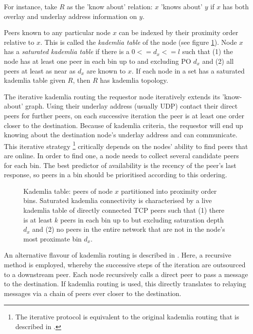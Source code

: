 \documentclass[a4paper,10pt,fullpage]{article}
\numberwithin{equation}{section}
\newcommand\gloss[1]{\emph{\gls{#1}}}
\theoremstyle{definition}
\begin{document}
For instance, take $R$ as the 'know about' relation:
$x$ 'knows about' $y$ if $x$ has both overlay and underlay address information on $y$. 


Peers known to any particular node $x$ can be indexed by their proximity order relative to $x$. This is called the \gloss{kademlia table} of the node (see figure \ref{fig:kademliatable}). 
Node $x$ has a \gloss{saturated kademlia table} if there is a $0<=d_x<=l$ such that (1) the node has at least one peer in each bin up to and excluding PO $d_x$ and (2) all peers at least as near as $d_x$ are known to $x$. 
If each node in a set has a saturated kademlia table given $R$, then $R$ has kademlia topology.


The iterative kademlia routing the requestor node iteratively extends its 'know-about' graph. Using their underlay address (usually UDP) contact their direct peers for further peers, on each successive iteration the peer is at least one order closer to the destination. Because of kademlia criteria, the requestor will end up knowing about the destination node's underlay address and can communicate. This iterative strategy%
%
\footnote{The iterative protocol is equivalent to   the original kademlia routing that is described in \cite{maymounkov2002kademlia}.
}
%
critically depends on the nodes' ability to find peers that are online. In order to find one, a node needs to collect several candidate peers for each bin. The best predictor of availability is the recency of the peer's last response, so peers in a bin should be prioritised according to this ordering.




\begin{figure}[htbp]
   \centering
   \caption{Kademlia table:  peers of node $x$ partitioned into proximity order bins. Saturated kademlia connectivity is 
   characterised by a live kademlia table of directly connected TCP peers such that (1) there is at least $k$ peers in each bin up to but excluding saturation depth $d_x$ and (2) no peers in the entire network that are not in the node's most proximate bin $d_x$. }
   \label{fig:kademliatable}
\end{figure}

An alternative flavour of kademlia routing is described in \cite{heep2010r}. Here, a recursive method is employed, whereby the successive steps of the iteration are outsourced to a downstream peer.
Each node recursively calls a direct peer to pass a message to the destination. If kademlia routing is used, this directly translates to relaying messages via a chain of peers ever closer to the destination.
\end{document}

